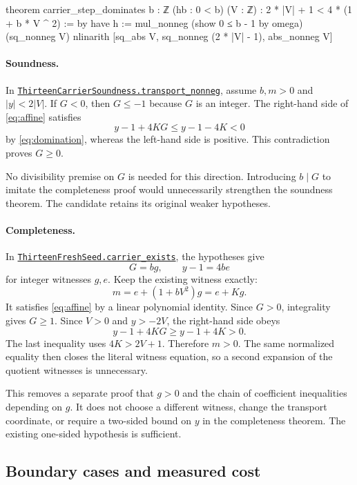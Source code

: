 \documentclass[11pt,letterpaper]{article}
\newcommand{\code}[1]{\nolinkurl{#1}}
\newcommand{\source}[2]{\href{https://github.com/VladimirReshetnikov/ProveIt/blob/efa64ca941cdae37bb6f7fc5093ae8bb69296ca3/Computability/DiophantineConsistency/Lean/DiophantineConsistency/#1.lean}{\code{#1.#2}}}
\begin{document}
\begin{Lean}
theorem carrier_step_dominates {b : ℤ} (hb : 0 < b) (V : ℤ) :
    2 * |V| + 1 < 4 * (1 + b * V ^ 2) := by
  have h := mul_nonneg (show 0 ≤ b - 1 by omega) (sq_nonneg V)
  nlinarith [sq_abs V, sq_nonneg (2 * |V| - 1), abs_nonneg V]
\end{Lean}

\paragraph{Soundness.}
In \source{ThirteenCarrierSoundness}{transport_nonneg}, assume $b,m>0$ and $|y|<2|V|$. If $G<0$, then $G\le-1$ because $G$ is an integer. The right-hand side of \eqref{eq:affine} satisfies
\[
 y-1+4KG\le y-1-4K<0
\]
by \eqref{eq:domination}, whereas the left-hand side is positive. This contradiction proves $G\ge0$.

No divisibility premise on $G$ is needed for this direction. Introducing $b\mid G$ to imitate the completeness proof would unnecessarily strengthen the soundness theorem. The candidate retains its original weaker hypotheses.

\paragraph{Completeness.}
In \source{ThirteenFreshSeed}{carrier_exists}, the hypotheses give
\[
 G=bg,\qquad y-1=4be
\]
for integer witnesses $g,e$. Keep the existing witness exactly:
\begin{equation}
 m=e+(1+bV^2)g=e+Kg.
 \label{eq:witness}
\end{equation}
It satisfies \eqref{eq:affine} by a linear polynomial identity. Since $G>0$, integrality gives $G\ge1$. Since $V>0$ and $y>-2V$, the right-hand side obeys
\[
 y-1+4KG\ge y-1+4K>0.
\]
The last inequality uses $4K>2V+1$. Therefore $m>0$. The same normalized equality then closes the literal witness equation, so a second expansion of the quotient witnesses is unnecessary.

This removes a separate proof that $g>0$ and the chain of coefficient inequalities depending on $g$. It does not choose a different witness, change the transport coordinate, or require a two-sided bound on $y$ in the completeness theorem. The existing one-sided hypothesis is sufficient.

\subsection{Boundary cases and measured cost}
\end{document}
